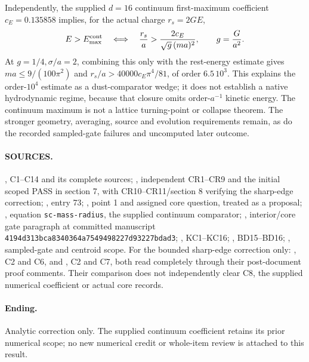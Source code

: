 \documentclass[11pt]{article}
\begin{document}
Independently, the supplied \(d=16\) continuum first-maximum
coefficient \(c_E=0.135858\) implies, for the actual charge
\(r_s=2GE\),
\[
 E>E_{\max}^{\rm cont}
 \quad\Longleftrightarrow\quad
 \frac{r_s}{a}>\frac{2c_E}{\sqrt g\,(ma)^2},
 \qquad g=\frac G{a^2}.
\]
At \(g=1/4,\sigma/a=2\), combining this only with the
rest-energy estimate gives \(ma\le9/(100\pi^2)\) and
\(r_s/a>40000c_E\pi^4/81\), of order \(6.5\,10^3\).
This explains the order-\(10^4\) estimate as a dust-comparator
wedge; it does not establish a native hydrodynamic regime,
because that closure omits order-\(a^{-1}\) kinetic energy.
The continuum maximum is not a lattice turning-point or
collapse theorem. The stronger geometry, averaging, source
and evolution requirements remain, as do the recorded
sampled-gate failures and uncomputed later outcome.

\paragraph{SOURCES.}
,
C1--C14 and its complete sources;
,
independent CR1--CR9 and the initial scoped PASS in section 7,
with CR10--CR11/section 8 verifying the sharp-edge correction;
, entry 73;
,
point 1 and assigned core question, treated as a proposal;
,
equation \texttt{sc-mass-radius}, the supplied continuum comparator;
,
interior/core gate paragraph at committed manuscript
\texttt{4194d313bca8340364a7549498227d93227bdad3};
,
KC1--KC16;
,
BD15--BD16;
,
sampled-gate and centroid scope.
For the bounded sharp-edge correction only:
,
C2 and C6, and
,
C2 and C7, both read completely through their post-document
proof comments. Their comparison does not independently clear
C8, the supplied numerical coefficient or actual core records.

\paragraph{Ending.}
Analytic correction only. The supplied continuum coefficient
retains its prior numerical scope; no new numerical credit or
whole-item review is attached to this result.
\end{document}
